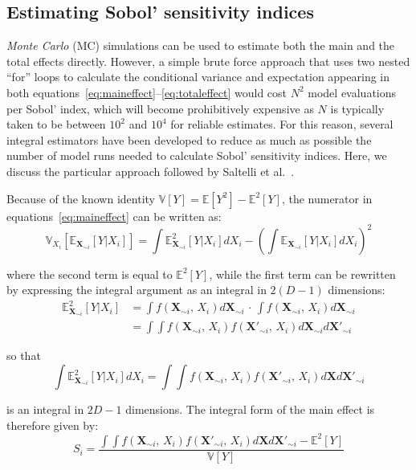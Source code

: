 \subsection{Estimating Sobol' sensitivity indices}\label{sec:ch3estimatingsobolsensitivityindices}
\textit{Monte Carlo} (\acs{MC}) simulations can be used to estimate both the main and the total effects directly. However, a simple brute force approach that uses two nested \enquote{for} loops to calculate the conditional variance and expectation appearing in both equations~\eqref{eq:maineffect}--\eqref{eq:totaleffect} would cost $N^2$ model evaluations per Sobol' index, which will become prohibitively expensive as $N$ is typically taken to be between $10^2$ and $10^4$ for reliable estimates. For this reason, several integral estimators have been developed to reduce as much as possible the number of model runs needed to calculate Sobol' sensitivity indices. Here, we discuss the particular approach followed by Saltelli et al.~\cite{Saltelli:2010}.

\vspace{0.2cm}
Because of the known identity $\mathbb{V}[Y] = \mathbb{E}[Y^2] - \mathbb{E}^2[Y]$, the numerator in equations~\eqref{eq:maineffect} can be written as:
%
\begin{equation}
    \mathbb{V}_{X_i}[\mathbb{E}_{\mathbf{X}_{\sim i}}[Y|X_i]] = \int \mathbb{E}^2_{\mathbf{X}_{\sim i}}[Y|X_i]dX_i - \left(\int \mathbb{E}_{\mathbf{X}_{\sim i}}[Y|X_i]dX_i\right)^2
\end{equation}

\noindent
where the second term is equal to $\mathbb{E}^2[Y]$, while the first term can be rewritten by expressing the integral argument as an integral in $2(D - 1)$ dimensions:
%
\begin{align}
    \mathbb{E}^2_{\mathbf{X}_{\sim i}}[Y|X_i] &= \int f(\mathbf{X}_{\sim i},\, X_i)d\mathbf{X}_{\sim i}\,\cdot\,\int f(\mathbf{X}_{\sim i},\, X_i)d\mathbf{X}_{\sim i} \\
    &= \int\int f(\mathbf{X}_{\sim i},\, X_i)f(\mathbf{X'}_{\sim i},\, X_i)d\mathbf{X}_{\sim i}d\mathbf{X'}_{\sim i}
\end{align}

\noindent
so that
%
\begin{equation}
    \int \mathbb{E}^2_{\mathbf{X}_{\sim i}}[Y|X_i]dX_i = \int\int f(\mathbf{X}_{\sim i},\, X_i)f(\mathbf{X'}_{\sim i},\, X_i)d\mathbf{X}d\mathbf{X'}_{\sim i}
\end{equation}

\noindent
is an integral in $2D - 1$ dimensions. The integral form of the main effect is therefore given by:
%
\begin{equation}\label{eq:mainintform}
    S_{i} = \frac{\int\int f(\mathbf{X}_{\sim i},\, X_i)f(\mathbf{X'}_{\sim i},\, X_i)d\mathbf{X}d\mathbf{X'}_{\sim i} - \mathbb{E}^2[Y]}{\mathbb{V}[Y]}
\end{equation}

